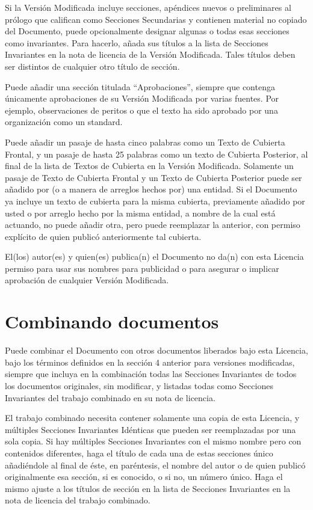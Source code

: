 Si  la  Versión  Modificada  incluye  secciones,  apéndices  nuevos  o
preliminares  al prólogo  que califican  como Secciones  Secundarias y
contienen  material  no  copiado del  Documento,  puede  opcionalmente
designar  algunas  o  todas  esas  secciones  como  invariantes.  Para
hacerlo, añada sus  títulos a la lista de Secciones  Invariantes en la
nota de  licencia de  la Versión Modificada.  Tales títulos  deben ser
distintos de cualquier otro título de sección.

Puede   añadir  una  sección  titulada  ``Aprobaciones'', siempre  que
contenga únicamente  aprobaciones de su Versión  Modificada por varias
fuentes. Por ejemplo, observaciones de peritos  o que el texto ha sido
aprobado por una organización como un standard.

Puede  añadir un  pasaje  de hasta  cinco palabras  como  un Texto  de
Cubierta Frontal,  y un pasaje de  hasta 25 palabras como  un texto de
Cubierta Posterior, al  final de la lista de Textos  de Cubierta en la
Versión Modificada. Solamente un pasaje de Texto de Cubierta Frontal y
un Texto  de Cubierta Posterior puede  ser añadido por (o  a manera de
arreglos hechos por) una entidad. Si  el Documento ya incluye un texto
de cubierta  para la misma  cubierta, previamente añadido por  usted o
por  arreglo hecho  por la  misma entidad,  a nombre  de la  cual está
actuando, no puede añadir otra, pero puede reemplazar la anterior, con
permiso explícito de quien publicó anteriormente tal cubierta.

El(los) autor(es)  y quien(es)  publica(n) el  Documento no  da(n) con
esta Licencia  permiso para  usar sus nombres  para publicidad  o para
asegurar o implicar aprobación de cualquier Versión Modificada.

\section{Combinando documentos}

Puede combinar el  Documento con otros documentos  liberados bajo esta
Licencia, bajo  los términos definidos  en la sección 4  anterior para
versiones  modificadas, siempre  que incluya  en la  combinación todas
las  Secciones Invariantes  de  todos los  documentos originales,  sin
modificar,  y listadas  todas como  Secciones Invariantes  del trabajo
combinado en su nota de licencia.

El trabajo  combinado necesita  contener solamente  una copia  de esta
Licencia,  y  múltiples  Secciones Invariantes  Idénticas  que  pueden
ser  reemplazadas  por una  sola  copia.  Si hay  múltiples  Secciones
Invariantes con el  mismo nombre pero con  contenidos diferentes, haga
el título  de cada una de  estas secciones único añadiéndole  al final
de  éste, en  paréntesis,  el  nombre del  autor  o  de quien  publicó
originalmente esa sección,  si es conocido, o si no,  un número único.
Haga el mismo ajuste a los títulos de sección en la lista de Secciones
Invariantes en la nota de licencia del trabajo combinado.

